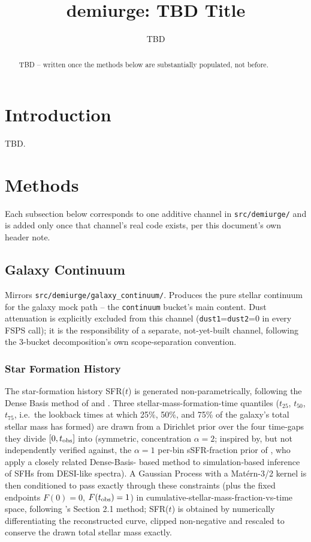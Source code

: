 \documentclass{aastex7}
\begin{document}
\title{demiurge: TBD Title}

\author{TBD}

\begin{abstract}
TBD -- written once the methods below are substantially populated, not
before.
\end{abstract}


\section{Introduction}
TBD.

\section{Methods}
Each subsection below corresponds to one additive channel in
\texttt{src/demiurge/} and is added only once that channel's real code
exists, per this document's own header note.

\subsection{Galaxy Continuum} \label{sec:galaxy-continuum}
Mirrors \texttt{src/demiurge/galaxy\_continuum/}. Produces the pure stellar
continuum for the galaxy mock path -- the \texttt{continuum} bucket's main
content. Dust attenuation is explicitly excluded from this channel
(\texttt{dust1}=\texttt{dust2}=0 in every FSPS call); it is the
responsibility of a separate, not-yet-built channel, following the 3-bucket
decomposition's own scope-separation convention.

\subsubsection{Star Formation History} \label{sec:sfh}
The star-formation history SFR($t$) is generated non-parametrically,
following the Dense Basis method of \citet{IyerGawiser2017} and
\citet{Iyer2019}. Three stellar-mass-formation-time quantiles
($t_{25}$, $t_{50}$, $t_{75}$, i.e.\ the lookback times at which 25\%,
50\%, and 75\% of the galaxy's total stellar mass has formed) are drawn
from a Dirichlet prior over the four time-gaps they divide $[0, t_{\rm
obs}]$ into (symmetric, concentration $\alpha=2$; inspired by, but not
independently verified against, the $\alpha=1$ per-bin sSFR-fraction prior
of \citet{IglesiasNavarro2024}, who apply a closely related Dense-Basis-
based method to simulation-based inference of SFHs from DESI-like spectra).
A Gaussian Process with a Mat\'ern-3/2 kernel is then conditioned to pass
exactly through these constraints (plus the fixed endpoints $F(0)=0$,
$F(t_{\rm obs})=1$) in cumulative-stellar-mass-fraction-vs-time space,
following \citet{Iyer2019}'s Section 2.1 method; SFR($t$) is obtained by
numerically differentiating the reconstructed curve, clipped non-negative
and rescaled to conserve the drawn total stellar mass exactly.
\end{document}
